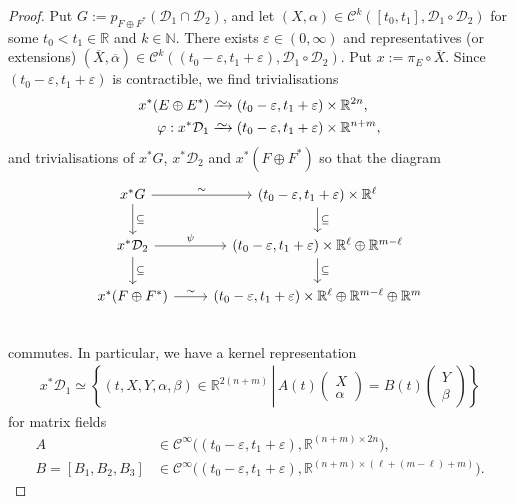 \documentclass[preprint,12pt]{elsarticle}
\theoremstyle{definition}
\newcommand{\set}[1]{\left\lbrace #1\right\rbrace}
\newcommand{\simto}{\xrightarrow{\raisebox{-0.7ex}[0ex][0ex]{$\sim$}}} %
\begin{document}
\begin{proof}
Put $G:=p_{F\oplus F^*}\left(\mathcal{D}_1\cap\mathcal{D}_2\right)$, and let $(X,\alpha)\in \mathcal{C}^k([t_0,t_1],\mathcal{D}_1\circ\mathcal{D}_2)$ for some $t_0<t_1\in\mathbb{R}$ and $k\in\mathbb{N}$. There exists $\varepsilon\in (0,\infty)$ and representatives (or extensions) $(\overline{X},\overline{\alpha})\in\mathcal{C}^k((t_0-\varepsilon,t_1+\varepsilon),\mathcal{D}_1\circ\mathcal{D}_2)$. Put $x := \pi_E\circ \overline{X}$. Since $(t_0-\varepsilon,t_1+\varepsilon)$ is contractible, we find trivialisations
\begin{align*}
x^*(E\oplus E^*) & \simto (t_0-\varepsilon,t_1+\varepsilon)\times\mathbb{R}^{2n},\\
\varphi:x^*\mathcal{D}_1 & \simto (t_0-\varepsilon,t_1+\varepsilon)\times\mathbb{R}^{n+m},
\end{align*}
and trivialisations of $x^*G$, $x^*\mathcal{D}_2$ and $x^*(F\oplus F^*)$ so that the diagram
\begin{equation}\label{eq:comm_diagram}
\begin{tikzcd}
x^*G \arrow[d,"\subseteq"]\arrow[r,"\sim"] & (t_0-\varepsilon,t_1+\varepsilon)\times\mathbb{R}^\ell\arrow[d,"\subseteq"]\\
x^*\mathcal{D}_2\arrow[r,"\psi"]\arrow[d,"\subseteq"] & (t_0-\varepsilon,t_1+\varepsilon)\times\mathbb{R}^\ell\oplus\mathbb{R}^{m-\ell}\arrow[d,"\subseteq"]\\ 
x^*(F\oplus F^*)\arrow[r,"\sim"] & (t_0-\varepsilon,t_1+\varepsilon)\times\mathbb{R}^\ell\oplus\mathbb{R}^{m-\ell}\oplus\mathbb{R}^{m}\\ 
\end{tikzcd}
\end{equation}
commutes. In particular, we have a kernel representation
\begin{align*}
x^*\mathcal{D}_1 \simeq \set{(t,X,Y,\alpha,\beta)\in\mathbb{R}^{2(n+m)}\,\left\vert\, A(t)\begin{pmatrix}
X\\\alpha
\end{pmatrix} = B(t)\begin{pmatrix}
Y\\\beta
\end{pmatrix}\right.}
\end{align*}
for matrix fields
\begin{align*}
A & \in\mathcal{C}^\infty\big((t_0-\varepsilon,t_1+\varepsilon),\mathbb{R}^{(n+m)\times 2n}\big),\\
B = [B_1, B_2, B_3] & \in\mathcal{C}^\infty\big((t_0-\varepsilon,t_1+\varepsilon),\mathbb{R}^{(n+m)\times (\ell+(m-\ell)+m)}\big).

\end{align*}
\end{proof}
\end{document}
